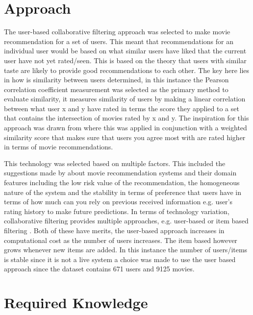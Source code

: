 \section{Approach}
The user-based collaborative filtering \cite{Schafer2007} approach was selected to make movie recommendation for a set of users. This meant that recommendations for an individual user would be based on what similar users have liked that the current user have not yet rated/seen. This is based on the theory that users with similar taste are likely to provide good recommendations to each other. The key here lies in how is similarity between users determined, in this instance the Pearson correlation coefficient measurement \cite{Wikipedia2017} was selected as the primary method to evaluate similarity, it measures similarity of users by making a linear correlation between what user x and y have rated in terms the score they applied to a set that contains the intersection of movies rated by x and y. The inspiration for this approach was drawn from \cite{Lead} where this was applied in conjunction with a weighted similarity score that makes sure that users you agree most with are rated higher in terms of movie recommendations.

This technology was selected based on multiple factors. This included the suggestions made by \cite{Burke2011} about movie recommendation systems and their domain features including the low risk value of the recommendation, the homogeneous nature of the system and the stability in terms of preference that users have in terms of how much can you rely on previous received information e.g. user's rating history to make future predictions. In terms of technology variation, collaborative filtering provides multiple approaches, e.g. user-based or item based filtering \cite{Yao}. Both of these have merits, the user-based approach increases in computational cost as the number of users increases. The item based however grows whenever new items are added. In this instance the number of users/items is stable since it is not a live system a choice was made to use the user based approach since the dataset contains 671 users and 9125 movies.

\section{Required Knowledge}

